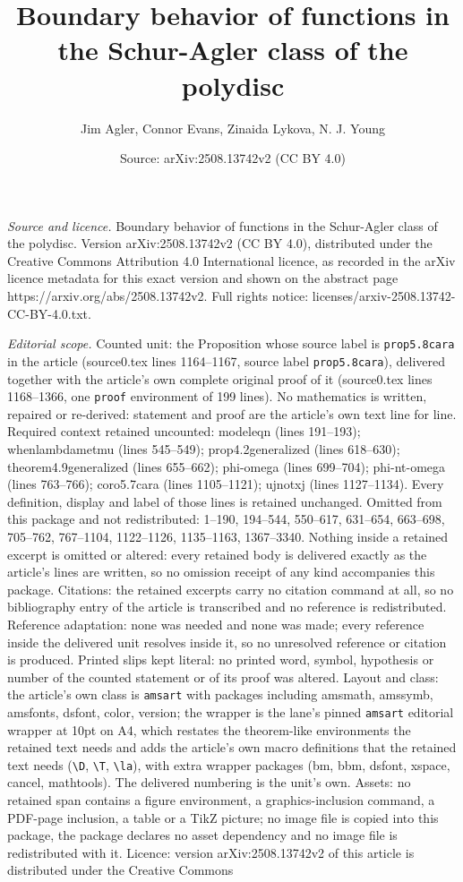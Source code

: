 \documentclass[10pt,a4paper]{amsart}
\title[Boundary behavior of functions in the Schur-Agler class of t]{Boundary behavior of functions in the Schur-Agler class of the polydisc}
\author{Jim Agler, Connor Evans, Zinaida Lykova, N. J. Young}
\date{Source: arXiv:2508.13742v2 (CC BY 4.0)}
\begin{document}
\maketitle

\noindent\emph{Source and licence.} Boundary behavior of functions in the Schur-Agler class of the polydisc. Version arXiv:2508.13742v2 (CC BY 4.0), distributed under the Creative Commons Attribution 4.0 International licence, as recorded in the arXiv licence metadata for this exact version and shown on the abstract page https://arxiv.org/abs/2508.13742v2. Full rights notice: licenses/arxiv-2508.13742-CC-BY-4.0.txt.\par\smallskip

\noindent\textit{Editorial scope.} Counted unit: the Proposition whose source label is \texttt{prop5.8cara} in the article (source0.tex lines 1164--1167, source label \texttt{prop5.8cara}), delivered together with the article's own complete original proof of it (source0.tex lines 1168--1366, one \texttt{proof} environment of 199 lines). No mathematics is written, repaired or re-derived: statement and proof are the article's own text line for line. Required context retained uncounted: modeleqn (lines 191--193); whenlambdametmu (lines 545--549); prop4.2generalized (lines 618--630); theorem4.9generalized (lines 655--662); phi-omega (lines 699--704); phi-nt-omega (lines 763--766); coro5.7cara (lines 1105--1121); ujnotxj (lines 1127--1134). Every definition, display and label of those lines is retained unchanged. Omitted from this package and not redistributed: 1--190, 194--544, 550--617, 631--654, 663--698, 705--762, 767--1104, 1122--1126, 1135--1163, 1367--3340. Nothing inside a retained excerpt is omitted or altered: every retained body is delivered exactly as the article's lines are written, so no omission receipt of any kind accompanies this package. Citations: the retained excerpts carry no citation command at all, so no bibliography entry of the article is transcribed and no reference is redistributed. Reference adaptation: none was needed and none was made; every reference inside the delivered unit resolves inside it, so no unresolved reference or citation is produced. Printed slips kept literal: no printed word, symbol, hypothesis or number of the counted statement or of its proof was altered. Layout and class: the article's own class is \texttt{amsart} with packages including amsmath, amssymb, amsfonts, dsfont, color, version; the wrapper is the lane's pinned \texttt{amsart} editorial wrapper at 10pt on A4, which restates the theorem-like environments the retained text needs and adds the article's own macro definitions that the retained text needs (\texttt{\textbackslash D}, \texttt{\textbackslash T}, \texttt{\textbackslash la}), with extra wrapper packages (bm, bbm, dsfont, xspace, cancel, mathtools). The delivered numbering is the unit's own. Assets: no retained span contains a figure environment, a graphics-inclusion command, a PDF-page inclusion, a table or a TikZ picture; no image file is copied into this package, the package declares no asset dependency and no image file is redistributed with it. Licence: version arXiv:2508.13742v2 of this article is distributed under the Creative Commons 
\end{document}
